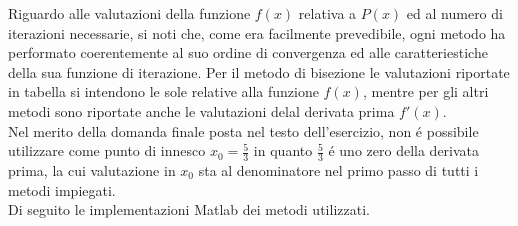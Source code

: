 \noindent Riguardo alle valutazioni della funzione \(f(x)\) relativa a \(P(x)\) ed al numero di iterazioni necessarie, si noti che, come era facilmente prevedibile, ogni metodo ha performato coerentemente al suo ordine di convergenza ed alle caratteriestiche della sua funzione di iterazione. Per il metodo di bisezione le valutazioni riportate in tabella si intendono le sole relative alla funzione \(f(x)\), mentre per gli altri metodi sono riportate anche le valutazioni delal derivata prima \(f'(x)\).
\\

\noindent Nel merito della domanda finale posta nel testo dell'esercizio, non \'e possibile utilizzare come punto di innesco \(x_0=\frac{5}{3}\) in quanto \(\frac{5}{3}\) \'e uno zero della derivata prima, la cui valutazione in \(x_0\) sta al denominatore nel primo passo di tutti i metodi impiegati.\\

\noindent Di seguito le implementazioni Matlab dei metodi utilizzati.


